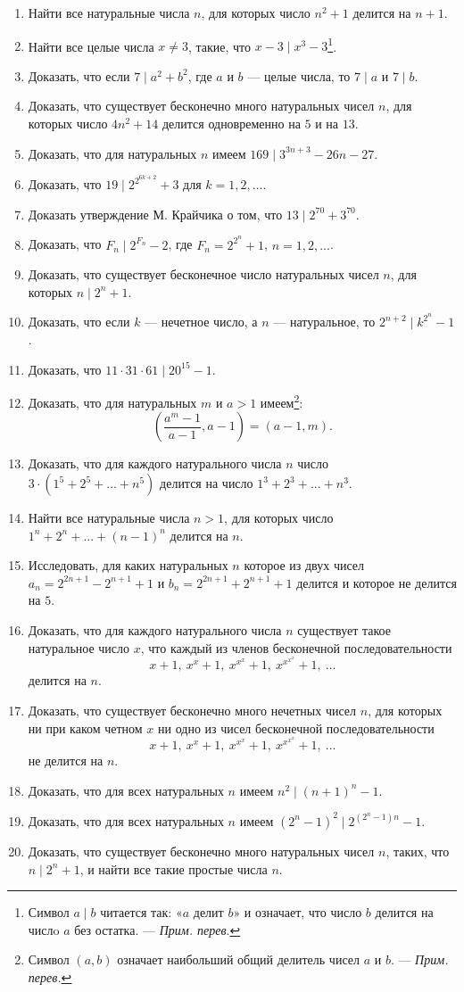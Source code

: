 \documentclass[12pt, a4paper, openany]{book}
\begin{document}
\begin{enumerate} 
\item Найти все натуральные числа $n$, для которых число $n^2+1$ делится на $n+1$.
\item Найти все целые числа $x \neq 3$, такие, что $x - 3 \mid x^3 - 3${\footnote{Символ $a \mid b$ читается так: «$a$ делит $b$» и означает, что число $b$ делится на числo $a$ без остатка. — \textit{Прим. перев}.}}.
\item Доказать, что если $7 \mid a^2 + b^2$, где $a$ и $b$ — целые числа, то $7 \mid a$ и $7 \mid b$.
\item Доказать, что существует бесконечно много натуральных чисел $n$, для которых число $4n^2+14$ делится одновременно на $5$ и на $13$.
\item Доказать, что для натуральных $n$ имеем $169 \mid 3^{3n+3} - 26n - 27$.
\item Доказать, что $19 \mid 2^{2^{6k+2}} + 3$ для $k=1, 2, ...$.
\item Доказать утверждение М. Крайчика о том, что $13 \mid 2^{70}+3^{70}$.
\item Доказать, что $F_n \mid 2^{F_n} - 2$, где $F_n=2^{2^n}+1$, $n=1, 2, ...$.
\item Доказать, что существует бесконечное число натуральных чисел $n$, для которых $n \mid 2^n+1$.
\item Доказать, что если $k$ — нечетное число, а $n$ — натуральное, то $2^{n+2} \mid k^{2^{n}}-1$.
\item Доказать, что $11\cdot31\cdot61 \mid 20^{15}-1$.
\item Доказать, что для натуральных $m$ и $a>1$ имеем{\footnote{Символ $(a, b)$ означает наибольший общий делитель чисел $a$ и $b$. — \textit{Прим. перев.}}}:
$$
\left( \frac{a^m - 1}{a-1}, a-1 \right) = (a-1, m).
$$
\item Доказать, что для каждого натурального числа $n$ число $3\cdot(1^5+2^5+...+n^5)$ делится на число $1^3+2^3+...+n^3$.
\item Найти все натуральные числа $n>1$, для которых число $1^n+2^n+...+(n-1)^n$ делится на $n$.
\item Исследовать, для каких натуральных $n$ которое из двух чисел $a_n=2^{2n+1}-2^{n+1}+1$ и $b_n=2^{2n+1}+2^{n+1}+1$  делится и которое не делится на $5$.
\item Доказать, что для каждого натурального числа $n$ существует такое натуральное число $x$, что каждый из членов бесконечной последовательности 
$$
x+1,\     x^{x}+1,\     x^{x^{x}}+1,\      x^{x^{x^{x}}}+1,\    ...
$$
делится на $n$.
\item Доказать, что существует бесконечно много нечетных чисел $n$, для которых ни при каком четном $x$ ни одно из чисел бесконечной последовательности 
$$
x+1,\     x^{x}+1,\     x^{x^{x}}+1,\      x^{x^{x^{x}}}+1,\    ...
$$
не делится на $n$.
\item Доказать, что для всех натуральных $n$ имеем $n^2 \mid (n+1)^n -1 $.
\item Доказать, что для всех натуральных $n$ имеем $(2^n-1)^2 \mid 2^{(2^n-1)n}-1$.
\item Доказать, что существует бесконечно много натуральных чисел $n$, таких, что $n \mid 2^n+1$, и найти все такие простые числа $n$.


\end{enumerate}
\end{document}

